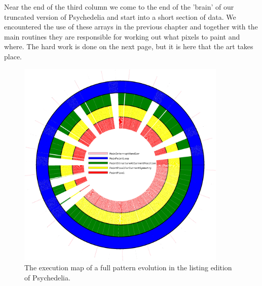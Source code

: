 Near the end of the third column we come to the end of the 'brain' of our truncated version of 
Psychedelia and start into a short section of data. We encountered the use of these arrays in the 
previous chapter and together with the main routines they are responsible for working out what pixels
to paint and where. The hard work is done on the next page, but it is here that the art takes place.

\begin{figure}[H]                                                          
  \centering                                                             
  \begin{adjustbox}{width=8cm,center}                                   
  \includegraphics[width=10cm]{src/listing_commentary/execution_cycle_listing.png}%
  \end{adjustbox}                                                        
\caption{The execution map of a full pattern evolution in the listing edition of Psychedelia.}                                           
\end{figure}                                                               
\clearpage
